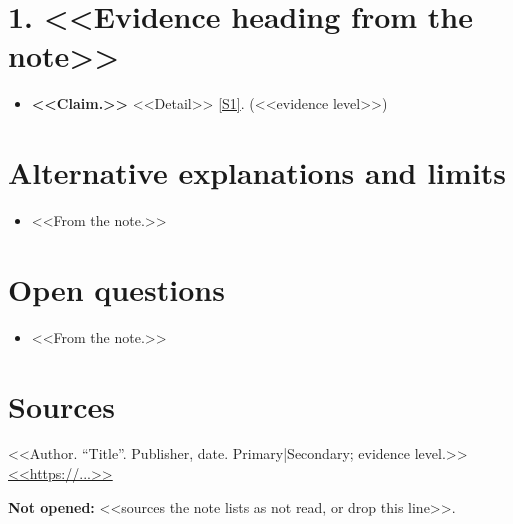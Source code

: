 \documentclass[11pt,a4paper]{article}
\newcommand{\src}[1]{\hyperlink{src:#1}{[#1]}}
\newcommand{\source}[3]{\item[\hypertarget{src:#1}{\textbf{\textcolor{accent}{[#1]}}}] #2 \\ \url{#3}}
\newenvironment{sources}{\begin{description}[leftmargin=2.6em, labelwidth=2.6em, itemsep=0.5em, font=\normalfont]}{\end{description}}
\newcommand{\lvl}[1]{\textcolor{muted}{(#1)}}
\begin{document}
\section{1. <<Evidence heading from the note>>}
\begin{itemize}
  \item \textbf{<<Claim.>>} <<Detail>> \src{S1}. \lvl{<<evidence level>>}
\end{itemize}


\section{Alternative explanations and limits}
\begin{itemize}
  \item <<From the note.>>
\end{itemize}

\section{Open questions}
\begin{itemize}
  \item <<From the note.>>
\end{itemize}

\section{Sources}
\begin{sources}
\source{S1}{<<Author. ``Title''. Publisher, date. Primary|Secondary; evidence level.>>}{<<https://...>>}
\end{sources}

\textbf{Not opened:} <<sources the note lists as not read, or drop this line>>.
\end{document}
